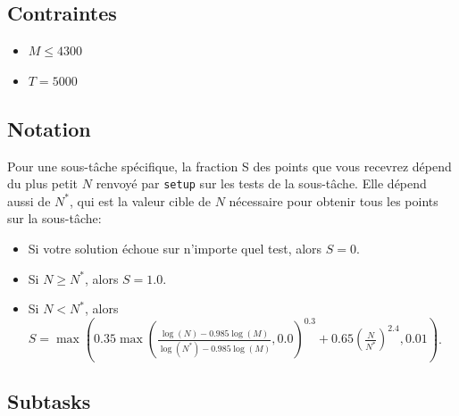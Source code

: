 \documentclass[12pt]{article}
\begin{document}
\subsection{Contraintes}

\begin{itemize}
\item $M \leq 4300$
\item $T = 5000$
\end{itemize}

\subsection{Notation}

Pour une sous-tâche spécifique, la fraction S des points que vous recevrez dépend du plus petit $N$ renvoyé par \texttt{setup} sur les tests de la sous-tâche. Elle dépend aussi de $N^*$, qui est la valeur cible de $N$ nécessaire pour obtenir tous les points sur la sous-tâche:

\begin{itemize}
\item Si votre solution échoue sur n'importe quel test, alors $S = 0$.
\item Si $N \geq N^*$, alors $S = 1.0$.
\item Si $N < N^*$, alors $S = \max\left(0.35 \max\left(\frac{\log(N) - 0.985 \log(M)}{\log(N^*) - 0.985 \log(M)}, 0.0\right)^{0.3} + 0.65 \left(\frac{N}{N^*}\right)^{2.4}, 0.01\right)$.
\end{itemize}

\subsection{Subtasks}
\end{document}
